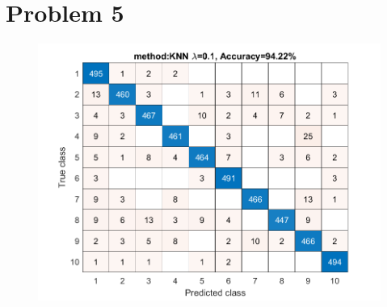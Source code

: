 \documentclass{article}
\begin{document}
\newpage
\section*{Problem 5}

\begin{figure}[H]
\includegraphics[scale = 0.75]{hwk4_problem5_plot.png}
\end{figure}

%
\end{document}
